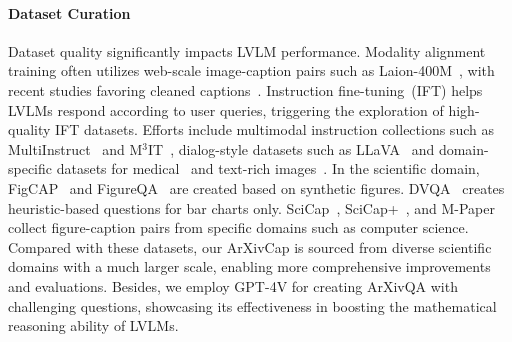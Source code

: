 \paragraph{Dataset Curation} Dataset quality significantly impacts LVLM performance. Modality alignment training often utilizes web-scale image-caption pairs such as Laion-400M~\citep{laion400m}, with recent studies favoring cleaned captions~\citep{sharegpt4v,capsfusion}. Instruction fine-tuning~(IFT) helps LVLMs respond according to user queries, triggering the exploration of high-quality IFT datasets. 
Efforts include multimodal instruction collections such as MultiInstruct~\citep{multiinstruct} and M$^3$IT~\citep{li2023m3it}, dialog-style datasets such as LLaVA~\citep{liu2023llava} and domain-specific datasets for medical~\citep{med-llava} and text-rich images~\citep{llavar}.
In the scientific domain, FigCAP~\citep{chen2019figcap} and FigureQA~\citep{kahou2017figureqa} are created based on synthetic figures.
DVQA~\citep{kafle2018dvqa} creates heuristic-based questions for bar charts only.
SciCap~\citep{hsu-etal-2021-scicap-generating}, SciCap+~\citep{Yang2023SciCap+}, and M-Paper~\citep{hu2023mplugpaperowl} collect figure-caption pairs from specific domains such as computer science.
Compared with these datasets, our ArXivCap is sourced from diverse scientific domains with a much larger scale, enabling more comprehensive improvements and evaluations. Besides, we employ GPT-4V for creating ArXivQA with challenging questions, showcasing its effectiveness in boosting the mathematical reasoning ability of LVLMs.



